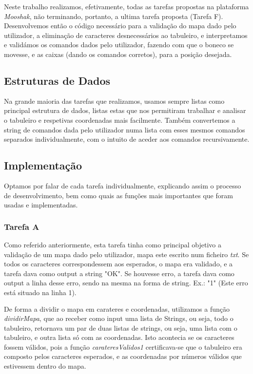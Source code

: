 \documentclass[a4paper]{article}
\begin{document}
Neste trabalho realizamos, efetivamente, todas as tarefas propostas na plataforma \textit{Mooshak}, não terminando, portanto, a ultima tarefa proposta (Tarefa F). Desenvolvemos então o código necessário para a validação do mapa dado pelo utilizador, a eliminação de caracteres desnecessários ao tabuleiro, e interpretamos e validámos os comandos dados pelo utilizador, fazendo com que o boneco se movesse, e as caixas (dando os comandos corretos), para a posição desejada.
	
\subsection{Estruturas de Dados}

Na grande maioria das tarefas que realizamos, usamos sempre listas como principal estrutura de dados, listas estas que nos permitiram trabalhar e analisar o tabuleiro e respetivas coordenadas mais facilmente. Também convertemos a string de comandos dada pelo utilizador numa lista com esses mesmos comandos separados individualmente, com o intuito de aceder aos comandos recursivamente. 


\subsection{Implementação}

Optamos por falar de cada tarefa individualmente, explicando assim o processo de desenvolvimento, bem como quais as funções mais importantes que foram usadas e implementadas.

\subsubsection{Tarefa A}

Como referido anteriormente, esta tarefa tinha como principal objetivo a validação de um mapa dado pelo utilizador, mapa este escrito num ficheiro \textit{txt}. Se todos os caracteres correspondessem aos esperados, o mapa era validado, e a tarefa dava como output a string "OK". Se houvesse erro, a tarefa dava como output a linha desse erro, sendo na mesma na forma de string. Ex.: "1" (Este erro está situado na linha 1). \par

De forma a dividir o mapa em carateres e coordenadas, utilizamos a função \textit{dividirMapa}, que ao receber como input uma lista de Strings, ou seja, todo o tabuleiro, retornava um par de duas listas de strings, ou seja, uma lista com o tabuleiro, e outra lista só com as coordenadas. Isto acontecia se os caracteres fossem válidos, pois a função \textit{carateresValidos1} certificava-se que o tabuleiro era composto pelos caracteres esperados, e as coordenadas por números válidos que estivessem dentro do mapa. \par
\end{document}
